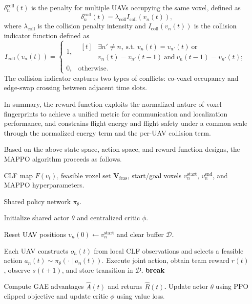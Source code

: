 \documentclass[lettersize,journal]{IEEEtran}
\begin{document}
$\delta_n^{\mathrm{coll}}(t)$ is the penalty for multiple UAVs occupying the same voxel, defined as
\begin{equation}
\delta_n^{\mathrm{coll}}(t)=\lambda_{\mathrm{coll}}I_{\mathrm{coll}}(v_n(t)),
\end{equation}
where $\lambda_{\mathrm{coll}}$ is the collision penalty intensity and $I_{\mathrm{coll}}(v_n(t))$ is the collision indicator function defined as
\begin{equation}
I_{\mathrm{coll}}(v_n(t))=
\begin{cases}
1, &\begin{aligned}[t]
&\exists n'\neq n,\ \text{s.t. }v_n(t)=v_{n'}(t)\ \text{or}\\
&v_n(t)=v_{n'}(t-1)\ \text{and}\ v_n(t-1)=v_{n'}(t);
\end{aligned}\\
0, & \mathrm{otherwise}.
\end{cases}
\end{equation}
The collision indicator captures two types of conflicts: co-voxel occupancy and edge-swap crossing between adjacent time slots.

In summary, the reward function exploits the normalized nature of voxel fingerprints to achieve a unified metric for communication and localization performance, and constrains flight energy and flight safety under a common scale through the normalized energy term and the per-UAV collision term.

Based on the above state space, action space, and reward function designs, the MAPPO algorithm proceeds as follows.

\begin{algorithm}[!t]
\caption{CLF-Aided Multi-UAV Trajectory Planning via MAPPO}
\label{alg:clf_mappo}
\scriptsize
\begin{algorithmic}
\REQUIRE CLF map $F(v_i)$, feasible voxel set $\mathbf{V}_{\mathrm{feas}}$,
start/goal voxels $v_n^{\mathrm{start}}$, $v_n^{\mathrm{end}}$,
and MAPPO hyperparameters.

\ENSURE Shared policy network $\pi_{\theta}$.

\STATE Initialize shared actor $\theta$ and centralized critic $\phi$.

\REPEAT
    \STATE Reset UAV positions $v_n(0)\leftarrow v_n^{\mathrm{start}}$ and clear buffer $\mathcal{D}$.

        \STATE Each UAV constructs $o_n(t)$ from local CLF observations and selects a feasible action
        $a_n(t)\sim\pi_{\theta}(\cdot\mid o_n(t))$.
        \STATE Execute joint action, obtain team reward $r(t)$, observe $s(t+1)$, and store transition in $\mathcal{D}$.
            \STATE \textbf{break}
        \ENDIF
    \ENDFOR

    \STATE Compute GAE advantages $\hat{A}(t)$ and returns $\hat{R}(t)$.
    \STATE Update actor $\theta$ using PPO clipped objective and update critic $\phi$ using value loss.

\end{algorithmic}
\end{algorithm}
\end{document}

